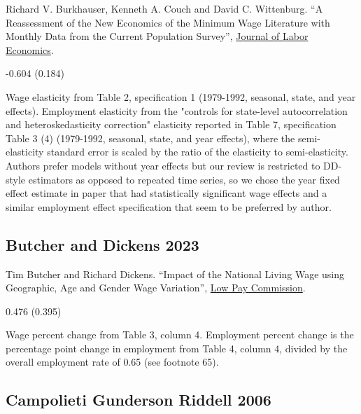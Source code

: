 \noindent Richard V. Burkhauser, Kenneth A. Couch and David C. Wittenburg. ``A Reassessment of the New Economics of the Minimum Wage Literature with Monthly Data from the Current Population Survey'', \href{https://doi.org/10.1086/209972}{Journal of Labor Economics}.

\vspace{0.7em}

 -0.604 (0.184)

\vspace{0.7em}

 Wage elasticity from Table 2, specification 1 (1979-1992, seasonal, state, and year effects). Employment elasticity from the "controls for state-level autocorrelation and heteroskedasticity correction" elasticity reported in Table 7, specification Table 3 (4) (1979-1992, seasonal, state, and year effects), where the semi-elasticity standard error is scaled by the ratio of the elasticity to semi-elasticity. Authors prefer models without year effects but our review is restricted to DD-style estimators as opposed to repeated time series, so we chose the year fixed effect estimate in paper that had statistically significant wage effects and a similar employment effect specification that seem to be preferred by author.

\subsection*{Butcher and Dickens 2023}
\vspace{-0.7em}

\noindent Tim Butcher and Richard Dickens. ``Impact of the National Living Wage using Geographic, Age and Gender Wage Variation'', \href{https://www.gov.uk/government/publications/national-living-wage-impacts-by-geography-age-and-gender}{Low Pay Commission}.

\vspace{0.7em}

 0.476 (0.395)

\vspace{0.7em}

 Wage percent change from Table 3, column 4. Employment percent change is the percentage point change in employment from Table 4, column 4, divided by the overall employment rate of 0.65 (see footnote 65).

\subsection*{Campolieti Gunderson Riddell 2006}
\vspace{-0.7em}

